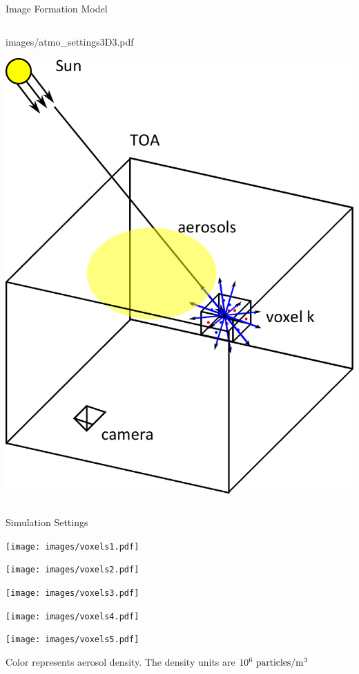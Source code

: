 \documentclass[compress,red,12pt]{beamer}
\begin{document}
\begin{frame}{Image Formation Model}
\begin{columns}[c]
\begin{overprint}
{{          {images/atmo_settings3D3.pdf}}}
       {\centerline{\includegraphics[width=\columnwidth]
          {images/atmo_settings3D5.pdf}}}
    \end{overprint}

  \end{columns}
\end{frame}


\begin{frame}[label=settings]{Simulation Settings}
  \begin{center}
    \begin{overlayarea}{\columnwidth}{8cm}
        {\centerline{\texttt{[image: images/voxels1.pdf]}}}
        {\centerline{\texttt{[image: images/voxels2.pdf]}}}
        {\centerline{\texttt{[image: images/voxels3.pdf]}}}
        {
          \hfill\hyperlink{air-density}{}  
          \centerline{\texttt{[image: images/voxels4.pdf]}}
        }
        {
          \hfill\hyperlink{typical-concentrations}{}  
          \centerline{\texttt{[image: images/voxels5.pdf]}}
          \begin{center}
            \tiny{Color represents aerosol density. The density units are $10^{6}~{\rm particles}/{\rm m}^3$}
          \end{center}
        }
    \end{overlayarea}
  \end{center}
\end{frame}
\end{document}
